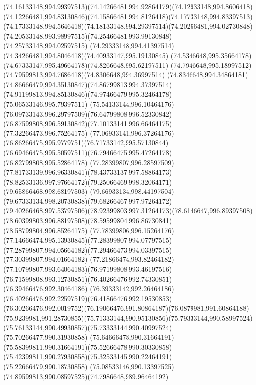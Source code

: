 {    \curveto(74.16133148,994.99397513)(74.14266481,994.92864179)(74.12933148,994.8606418)
    \curveto(74.12266481,994.83130846)(74.15866481,994.8126418)(74.17733148,994.83397513)
    \curveto(74.17333148,994.5646418)(74.18133148,994.29397514)(74.20266481,994.02730848)
    \curveto(74.20533148,993.98997515)(74.25466481,993.99130848)(74.25733148,994.02597515)
    \curveto(74.29333148,994.41397514)(74.34266481,994.8046418)(74.40933147,995.19130845)
    \curveto(74.5346648,995.35664178)(74.67333147,995.49664178)(74.8266648,995.62197511)
    \curveto(74.7946648,995.18997512)(74.79599813,994.7686418)(74.8306648,994.36997514)
    \curveto(74.8346648,994.34864181)(74.86666479,994.35130847)(74.86799813,994.37397514)
    \curveto(74.91199813,994.85130846)(74.97466479,995.32464178)(75.06533146,995.79397511)
    \curveto(75.54133144,996.10464176)(76.09733143,996.29797509)(76.64799808,996.52330842)
    \curveto(76.87599808,996.59130842)(77.10133141,996.66464175)(77.32266473,996.75264175)
    \curveto(77.06933141,996.37264176)(76.86266475,995.9779751)(76.71733142,995.57130844)
    \curveto(76.69466475,995.50597511)(76.79466475,995.47264178)(76.82799808,995.52864178)
    \curveto(77.28399807,996.28597509)(77.81733139,996.96330841)(78.43733137,997.58864173)
    \curveto(78.82533136,997.97664172)(79.25066469,998.32064171)(79.65866468,998.68197503)
    \curveto(79.66933134,998.44197504)(79.67333134,998.20730838)(79.68266467,997.97264172)
    \curveto(79.40266468,997.53797506)(78.92399803,997.31264173)(78.6146647,996.89397508)
    \curveto(78.60399803,996.88197508)(78.59599804,996.86730841)(78.58799804,996.85264175)
    \curveto(77.78399806,996.15264176)(77.14666474,995.13930845)(77.28399807,994.07797515)
    \curveto(77.28799807,994.05664182)(77.29466473,994.03397515)(77.30399807,994.01664182)
    \curveto(77.21866474,993.82464182)(77.10799807,993.64064183)(76.97199808,993.46197516)
    \curveto(76.71599808,993.12730851)(76.40266476,992.74330851)(76.39466476,992.30464186)
    \curveto(76.39333142,992.26464186)(76.40266476,992.22597519)(76.41866476,992.19530853)
    \curveto(76.30266476,992.0019752)(76.19066476,991.80864187)(76.0879981,991.60864188)
    \curveto(75.9239981,991.28730855)(75.71333144,990.95130856)(75.79333144,990.58997524)
    \curveto(75.76133144,990.49930857)(75.73333144,990.40997524)(75.70266477,990.31930858)
    \curveto(75.64666478,990.31664191)(75.58399811,990.31664191)(75.52666478,990.30330858)
    \curveto(75.42399811,990.27930858)(75.32533145,990.22464191)(75.22666479,990.18730858)
    \curveto(75.08533146,990.13397525)(74.89599813,990.08597525)(74.7986648,989.96464192)
}
